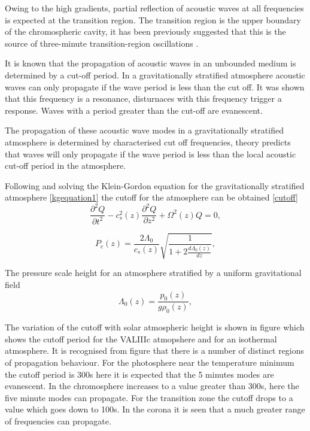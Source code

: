 \documentclass[final,1p]{elsarticle}
\begin{document}
Owing to the high gradients, partial reflection of acoustic waves at all frequencies is expected at the transition region. The transition region is the upper boundary of the chromospheric cavity, it has been previously suggested that this is the source of three-minute transition-region oscillations \cite{Leibacher1971}.

It is known that the propagation of acoustic waves in an unbounded medium is determined by a cut-off period. In a gravitationally stratified atmosphere acoustic waves can only propagate if the wave period is less than the cut off. It was shown that this frequency is a resonance, disturnaces with this frequency trigger a response. Waves with a period greater than the cut-off are evanescent.

The propagation of these acoustic wave modes in a gravitationally stratified atmosphere is determined by characterised cut off frequencies, theory predicts that waves will only propagate if the wave period is less than the local acoustic cut-off period in the atmosphere.

Following \cite{Taroyan2008} and solving the Klein-Gordon equation for the gravitationally stratified atmosphere \eqref{kgequation1} the cutoff for the atmosphere can be obtained \eqref{cutoff}
\begin{equation}\label{kgequation1}
\frac{\partial^2 Q}{\partial t^2} - c_s^2(z) \frac{\partial^2 Q}{\partial z^2} + \Omega^2(z)Q = 0 ,
\end{equation}

\begin{equation}\label{cutoff}
P_{c}(z)=\frac{   2\Lambda_0   }{ c_{s}(z)}   \sqrt{\frac{1}{1+2\frac{d\Lambda_0(z)}{dz}}} ,
\end{equation}

The pressure scale height for an atmosphere stratified by a uniform gravitational field
\begin{equation}\label{lambda0}
\Lambda_0(z)=\frac{p_0(z)}{g\rho_0(z)} ,
\end{equation}

The variation of the cutoff with solar atmospheric height is shown in figure  which shows the cutoff period for the VALIIIc atmopshere and for an isothermal atmosphere. It is recognised from figure  that there is a number of distinct regions of propagation behaviour. For the photosphere near the temperature minimum  the cutoff period is 300s here it is expected that the 5 minutes modes are evanescent. In the chromosphere increases to a value greater than 300s, here the five minute modes can propagate. For the transition zone the cutoff drops to a value which goes down to 100s. In the corona it is seen that a much greater range of frequencies can propagate.
\end{document}
